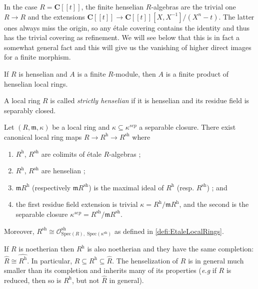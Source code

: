\begin{example}
In the case $R = \mathbf{C} [[ t ]]$, the finite henselian $R$-algebras are the 
trivial one $R \to R$ and the extensions $ \mathbf{C} [[ t ]] \to \mathbf{C} [[ 
t ]] [X, X^{-1}]/(X^n-t)$. The latter ones always miss the origin, so any 
\'etale covering contains the identity and thus has the trivial covering as 
refinement. We will see below that this is in fact a somewhat general fact and 
this will give us the vanishing of higher direct images for a finite morphism.
\end{example}

\begin{lemma} \label{cor:FiniteOverHenselianIs Henselian}
If $R$ is henselian and $A$ is a finite $R$-module, then $A$ is a finite 
product of henselian local rings. 
\end{lemma}

\begin{definition} 
A local ring $R$ is called {\it strictly henselian} if it is henselian and its 
residue field is separably closed. 
\end{definition}

\begin{theorem}
Let $(R, \mathfrak m, \kappa)$ be a local ring and 
$\kappa\subseteq\kappa^{sep}$ a separable closure. There exist canonical local 
ring maps $ R\to R^\text{h} \to R^\text{sh}$ where
\begin{enumerate}
\item $R^\text{h}$, $R^\text{sh}$ are colimits of \'etale $R$-algebras ;
\item $R^\text{h}$, $R^\text{sh}$ are henselian ;
\item $\mathfrak m R^\text{h}$ (respectively $\mathfrak m R^\text{sh}$) is the 
maximal ideal of $R^\text{h}$ (resp. $R^\text{sh}$) ; and 
\item the first residue field extension is trivial $\kappa=R^\text{h}/\mathfrak 
m R^\text{h}$, and the second is the separable closure $\kappa^{sep} = 
R^\text{sh}/\mathfrak m R^\text{sh}$. 
\end{enumerate} 
Moreover, $R^\text{sh}\cong \mathcal{O}^\text{sh}_{\text{Spec}(R), \; 
\text{Spec}(\kappa^\text{sh})}$ as defined in \ref{defi:EtaleLocalRings}.
\end{theorem}

\begin{remark} 
If $R$ is noetherian then $R^\text{h}$ is also noetherian and they have the 
same completion: $\hat R\cong \widehat{R^\text{h}}$. In particular, $R\subseteq 
R^\text{h} \subseteq \hat R$. The henselization of $R$ is in general much 
smaller than its completion and inherits many of its properties ({\it e.g} if 
$R$ is reduced, then so is $R^\text{h}$, but not $\hat R$ in general).
\end{remark}

